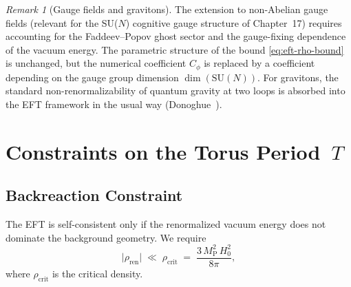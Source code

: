 \documentclass[12pt,openany]{book}
\theoremstyle{plain}
\theoremstyle{definition}
\theoremstyle{remark}
\newtheorem{eftremark}[efttheorem]{Remark}
\providecommand{\Mpl}{M_{\mathrm{P}}}
\providecommand{\abs}[1]{\lvert #1 \rvert}
\providecommand{\Ren}{\mathrm{ren}}
\begin{document}
\begin{eftremark}[Gauge fields and gravitons]
The extension to non-Abelian gauge fields (relevant for the SU($N$)
cognitive gauge structure of Chapter~17) requires accounting for the
Faddeev--Popov ghost sector and the gauge-fixing dependence of the
vacuum energy.  The parametric structure of the bound
\eqref{eq:eft-rho-bound} is unchanged, but the numerical coefficient
$C_{\phi}$ is replaced by a coefficient depending on the gauge group
dimension $\dim(\mathrm{SU}(N))$.  For gravitons, the standard
non-renormalizability of quantum gravity at two loops
\cite{GoroffSagnotti1986} is absorbed into the EFT framework in the
usual way (Donoghue~\cite{Donoghue1994}).
\end{eftremark}


\section{Constraints on the Torus Period~$T$}
\label{sec:eft-T-bounds}

\subsection{Backreaction Constraint}
\label{sec:eft-backreaction}

The EFT is self-consistent only if the renormalized vacuum energy
does not dominate the background geometry.  We require
\begin{equation}\label{eq:eft-backreaction}
  \abs{\rho_{\Ren}}
  \;\ll\;
  \rho_{\mathrm{crit}}
  \;=\;
  \frac{3\,\Mpl^{2}\,H_{0}^{2}}{8\pi},
\end{equation}
where $\rho_{\mathrm{crit}}$ is the critical density.
\end{document}
